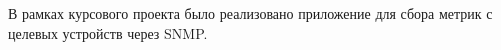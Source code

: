 В рамках курсового проекта было реализовано приложение для сбора метрик с целевых устройств
через SNMP.

\printbibliography[title={\centering\textbf{Список использованных источников}}]